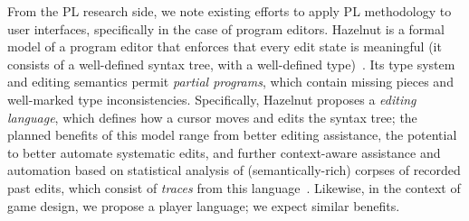 From the PL research side, we note existing efforts to apply PL
methodology to user interfaces, specifically in the case of program
editors.
Hazelnut is a formal model of a program editor that enforces that
every edit state is meaningful (it consists of a well-defined syntax
tree, with a well-defined type)~\cite{omar17hazelnut}.
%
Its type system and editing semantics permit \emph{partial programs},
which contain missing pieces and well-marked type inconsistencies.
%
Specifically, Hazelnut proposes a \emph{editing language}, which
defines how a cursor moves and edits the syntax tree; the planned
benefits of this model range from better editing assistance, the
potential to better automate systematic edits, and further
context-aware assistance and automation based on statistical analysis
of (semantically-rich) corpses of recorded past edits, which consist
of \emph{traces} from this language~\cite{omar17hazel}.
%
Likewise, in the context of game design, we propose a player language;
we expect similar benefits.

% 

